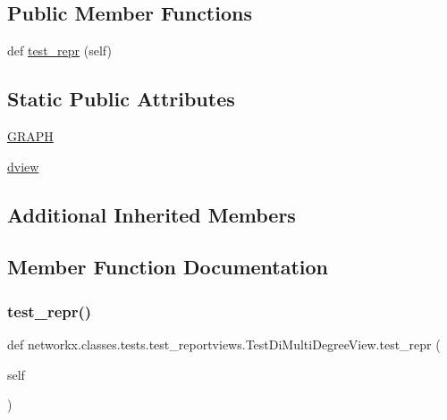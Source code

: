 \subsection*{Public Member Functions}
\begin{DoxyCompactItemize}
\item 
def \hyperlink{classnetworkx_1_1classes_1_1tests_1_1test__reportviews_1_1TestDiMultiDegreeView_ac9bc449e00cb25c7609e780546757dbe}{test\+\_\+repr} (self)
\end{DoxyCompactItemize}
\subsection*{Static Public Attributes}
\begin{DoxyCompactItemize}
\item 
\hyperlink{classnetworkx_1_1classes_1_1tests_1_1test__reportviews_1_1TestDiMultiDegreeView_abd69861a7cc76491e93dca720b5ff4ae}{G\+R\+A\+PH}
\item 
\hyperlink{classnetworkx_1_1classes_1_1tests_1_1test__reportviews_1_1TestDiMultiDegreeView_a0cc11eb6d81715eb53177776c04c096d}{dview}
\end{DoxyCompactItemize}
\subsection*{Additional Inherited Members}


\subsection{Member Function Documentation}
\mbox{\label{classnetworkx_1_1classes_1_1tests_1_1test__reportviews_1_1TestDiMultiDegreeView_ac9bc449e00cb25c7609e780546757dbe}} 
\subsubsection{\texorpdfstring{test\+\_\+repr()}{test\_repr()}}
{\footnotesize\ttfamily def networkx.\+classes.\+tests.\+test\+\_\+reportviews.\+Test\+Di\+Multi\+Degree\+View.\+test\+\_\+repr (\begin{DoxyParamCaption}\item[{}]{self }\end{DoxyParamCaption})}



